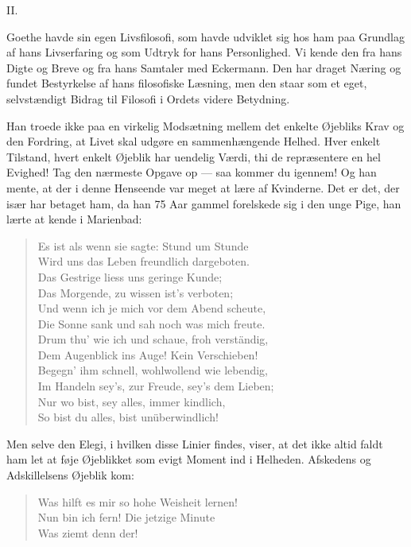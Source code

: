 \documentclass[12pt,a4paper,openany]{book}
\newcommand{\opage}[1]{\marginnote{\footnotesize\textit{[#1]}}}
\begin{document}
\begin{center}II.\end{center}


Goethe havde sin egen Livsfilosofi, som havde udviklet
sig hos ham paa Grundlag af hans Livserfaring og som Udtryk
for hans Personlighed. Vi kende den fra hans Digte og Breve
og fra hans Samtaler med Eckermann. Den har draget Næring
og fundet Bestyrkelse af hans filosofiske Læsning, men den
staar som et eget, selvstændigt Bidrag til Filosofi i Ordets
videre Betydning.

\setcounter{footnote}{0}%
\opage{167}Han troede ikke paa en virkelig Modsætning mellem det
enkelte Øjebliks Krav og den Fordring, at Livet skal udgøre
en sammenhængende Helhed. Hver enkelt Tilstand, hvert enkelt
Øjeblik har uendelig Værdi, thi de repræsentere en hel
Evighed! Tag den nærmeste Opgave op --- saa kommer du
igennem! Og han mente, at der i denne Henseende var meget
at lære af Kvinderne. Det er det, der især har betaget ham,
da han 75 Aar gammel forelskede sig i den unge Pige, han
lærte at kende i Marienbad:

\begin{quote}
Es ist als wenn sie sagte: Stund um Stunde\\
Wird uns das Leben freundlich dargeboten.\\
Das Gestrige liess uns geringe Kunde;\\
Das Morgende, zu wissen ist’s verboten;\\
Und wenn ich je mich vor dem Abend scheute,\\
Die Sonne sank und sah noch was mich freute.\\
Drum thu’ wie ich und schaue, froh verständig,\\
Dem Augenblick ins Auge! Kein Verschieben!\\
Begegn’ ihm schnell, wohlwollend wie lebendig,\\
Im Handeln sey’s, zur Freude, sey’s dem Lieben;\\
Nur wo bist, sey alles, immer kindlich,\\
So bist du alles, bist unüberwindlich!
\end{quote}

Men selve den Elegi, i hvilken disse Linier findes, viser,
at det ikke altid faldt ham let at føje Øjeblikket som evigt
Moment ind i Helheden. Afskedens og Adskillelsens Øjeblik
kom:
\begin{quote}
Was hilft es mir so hohe Weisheit lernen!\\
Nun bin ich fern! Die jetzige Minute\\
Was ziemt denn der!
\end{quote}
\end{document}
